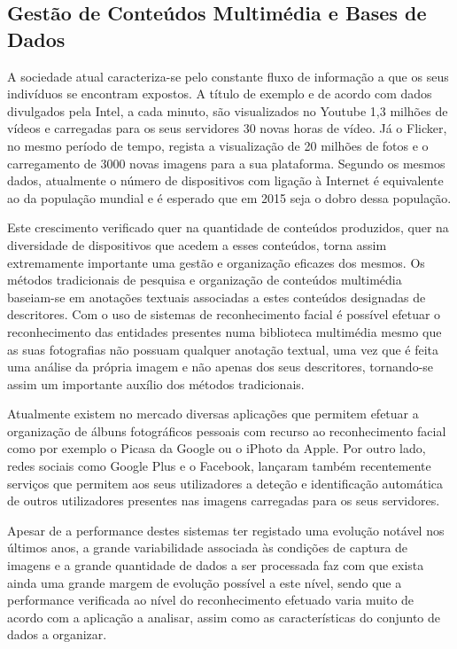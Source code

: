 \subsection{Gestão de Conteúdos Multimédia e Bases de Dados} \label{GestaoMultimedia}
A sociedade atual caracteriza-se pelo constante fluxo de informação a que os seus indivíduos se encontram expostos. A título de exemplo e de acordo com dados divulgados pela Intel\citep{IntelCorporation}, a cada minuto, são visualizados no Youtube 1,3 milhões de vídeos e carregadas para os seus servidores 30 novas horas de vídeo. Já o Flicker, no mesmo período de tempo, regista a visualização de 20 milhões de fotos e o carregamento de 3000 novas imagens para a sua plataforma. Segundo os mesmos dados, atualmente o número de dispositivos com ligação à Internet é equivalente ao da população mundial e é esperado que em 2015 seja o dobro dessa população.

Este crescimento verificado quer na quantidade de conteúdos produzidos, quer na diversidade de dispositivos que acedem a esses conteúdos, torna assim extremamente importante uma gestão e organização eficazes dos mesmos. Os métodos tradicionais de pesquisa e organização de conteúdos multimédia baseiam-se em anotações textuais associadas a estes conteúdos designadas de descritores. Com o uso de sistemas de reconhecimento facial é possível efetuar o reconhecimento das entidades presentes numa biblioteca multimédia mesmo que as suas fotografias não possuam qualquer anotação textual, uma vez que é feita uma análise da própria imagem e não apenas dos seus descritores, tornando-se assim um importante auxílio dos métodos tradicionais.

Atualmente existem no mercado diversas aplicações que permitem efetuar a organização de álbuns fotográficos  pessoais com recurso ao reconhecimento facial como por exemplo o Picasa da Google ou o iPhoto da Apple. Por outro lado, redes sociais como Google Plus e o Facebook, lançaram também recentemente serviços que permitem aos seus utilizadores a deteção e identificação automática de outros utilizadores presentes nas imagens carregadas para os seus servidores.

Apesar de a performance destes sistemas ter registado uma evolução notável nos últimos anos, a grande variabilidade associada às condições de captura de imagens e a grande quantidade de dados a ser processada faz com que exista ainda uma grande margem de evolução possível a este nível, sendo que a performance verificada ao nível do reconhecimento efetuado varia muito de acordo com a aplicação a analisar, assim como as características do conjunto de dados a organizar.

